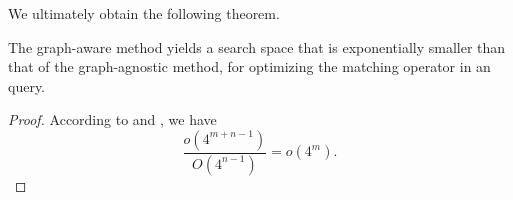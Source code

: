 We ultimately obtain the following theorem.

\begin{theorem}
    \label{thm:compare-search-space}
    The graph-aware method yields a search space that is exponentially smaller than that of the graph-agnostic method,
    for optimizing the matching operator in an \spjm query.
\end{theorem}
\begin{proof}
    According to  and , we have
    \begin{equation*}
        \frac{o(4^{m+n-1})}{O(4^{n-1})} = o(4^m).
    \end{equation*}
\end{proof}


